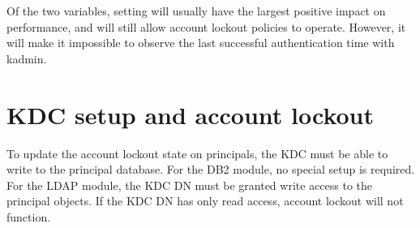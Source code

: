 \documentclass[letterpaper,10pt,english]{sphinxmanual}
\begin{document}
\begin{sphinxVerbatim}[commandchars=\\\{\}]
\PYG{p}{[}\PYG{p}{]}
      
          
          
\end{sphinxVerbatim}

\sphinxAtStartPar
Of the two variables, setting  will usually
have the largest positive impact on performance, and will still allow
account lockout policies to operate.  However, it will make it
impossible to observe the last successful authentication time with
kadmin.


\section{KDC setup and account lockout}
\label{\detokenize{admin/lockout:kdc-setup-and-account-lockout}}
\sphinxAtStartPar
To update the account lockout state on principals, the KDC must be
able to write to the principal database.  For the DB2 module, no
special setup is required.  For the LDAP module, the KDC DN must be
granted write access to the principal objects.  If the KDC DN has only
read access, account lockout will not function.

\sphinxstepscope
\end{document}
